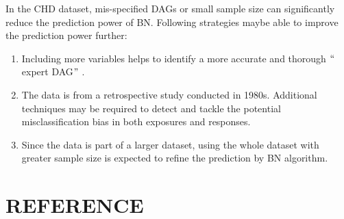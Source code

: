 \documentclass{article}
\begin{document}
In the CHD dataset, mis-specified DAGs or small sample size can significantly reduce the prediction power of BN. Following strategies maybe able to improve the prediction power further: 
\vspace{-1.5em}
\begin{enumerate}
\setlength\itemsep{0em}
\setlength\itemindent{-1em}
	\item Including more variables helps to identify a more accurate and thorough $``$expert DAG$"$ . 
	\item The data is from a retrospective study conducted in 1980s. Additional techniques may be required to detect and tackle the potential misclassification bias in both exposures and responses.
	\item Since the data is part of a larger dataset, using the whole dataset with greater sample size is expected to refine the prediction by BN algorithm. 
\end{enumerate} \par




\section{REFERENCE}
\end{document}
